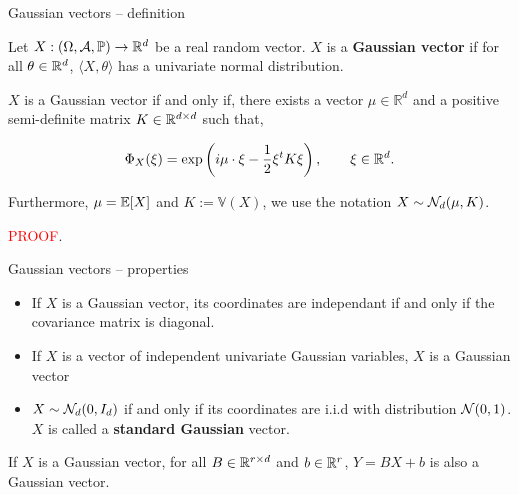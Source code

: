 \documentclass[handout]{beamer} %
\begin{document}
  \begin{frame}{Gaussian vectors -- definition}
    \begin{definition}
      Let $X:(\Omega,\mathcal{A},\mathbb{P}) \to \mathbb{R}^{d}$ be a real random vector. $X$ is a \textbf{Gaussian
        vector} if for all $\theta \in \mathbb{R}^{d}$, $\langle X, \theta \rangle$ has a
      univariate normal distribution.
    \end{definition}

    \pause

    \begin{theorem} $X$ is a Gaussian vector if and only if, there exists a
      vector $\mu \in \mathbb{R}^{d}$ and a positive semi-definite matrix $K \in \mathbb{R}^{d \times d}$ such that,

      \begin{equation}
        \Phi_{X}(\xi)=\exp \left(i \mu \cdot \xi-\frac{1}{2} \xi^t K \xi\right),
        \qquad \xi \in \mathbb{R}^{d}.
      \end{equation}

      Furthermore, $\mu = \mathbb{E}[X]$ and $K := \mathbb{V}(X)$, we use the notation
      $X \sim \mathcal{N}_d(\mu,K)$.
    \end{theorem}

    \textcolor{red}{PROOF}.
  \end{frame}

  \begin{frame}{Gaussian vectors -- properties}

    \begin{corollary}
      \begin{itemize}
      \item If $X$ is a Gaussian vector, its coordinates are independant if and only if
        the covariance matrix is diagonal.

        \pause

      \item If $X$ is a vector of independent univariate
        Gaussian variables, $X$ is a Gaussian vector

        \pause

      \item  $X \sim \mathcal{N}_d(0,I_d)$ if and only if its coordinates are i.i.d with
        distribution $\mathcal{N}(0,1)$. $X$ is called a \textbf{standard Gaussian}
        vector.

      \end{itemize}
    \end{corollary}

    \pause

    \begin{proposition}
      If $X$ is a Gaussian vector, for all $B \in \mathbb{R}^{r \times d}$ and $b
      \in \mathbb{R}^r$, $Y = BX + b$ is also a Gaussian vector.
    \end{proposition}

  \end{frame}
\end{document}
